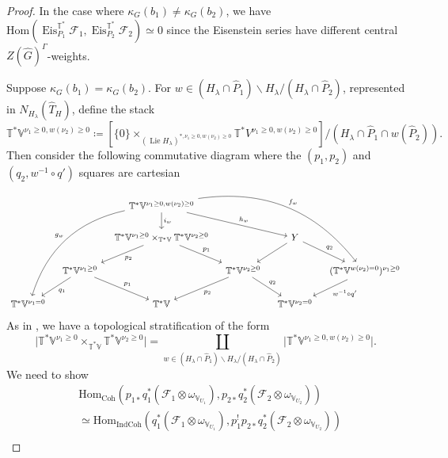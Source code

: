 \documentclass{amsart}
\theoremstyle{definition}
\theoremstyle{remark}
\numberwithin{equation}{section}
\DeclareMathOperator{\Lie}{Lie}
\newcommand{\mc}{\mathcal}
\newcommand{\Hom}{\mathrm{Hom}}
\newcommand{\wh}{\widehat}
\newcommand{\IndCoh}{\mathrm{IndCoh}}
\DeclareMathOperator{\Eis}{\mathrm{Eis}}
\newcommand{\Coh}{\mathrm{Coh}}
\newcommand{\V}{\mathbb{V}}
\newcommand{\T}{\mathbb{T}}
\begin{document}
\begin{proof}
In the case where $\kappa_G(b_1) \neq \kappa_G(b_2)$, we have $\Hom (\Eis^{\T^{\ast}}_{P_1} \mc F_1, \Eis^{\T^{\ast}}_{P_2} \mc F_2)\simeq 0$ since the Eisenstein series have different central $Z(\wh{G})^{\Gamma}$-weights. 

Suppose $\kappa_G(b_1) = \kappa_G(b_2)$. For $w\in (H_\lambda\cap \wh P_1)\backslash H_\lambda / (H_\lambda \cap \wh P_2)$, represented in $N_{H_\lambda}(\wh T_H)$, define the stack
\begin{equation*}
    \T^{\ast}\V^{\nu_1 \geq 0, w(\nu_2) \geq 0} \coloneq [\{0\} \times_{ (\Lie H_{\lambda})^{\ast, \nu_1 \geq 0, w(\nu_2) \geq 0}} \T^{\ast}V^{\nu_1 \geq 0, w(\nu_2) \geq 0}] / (H_{\lambda} \cap \wh P_1 \cap w(\wh P_2)).
\end{equation*}
Then consider the following commutative diagram where the $(p_1, p_2)$ and $(q_2, w^{-1} \circ q')$ squares are cartesian 
\[
\begin{tikzcd}[column sep=1em]
        && \T^* \V^{\nu_1 \geq 0, w(\nu_2)\geq 0} \arrow[d, "i_w"] \arrow[dddll,bend right,"g_w",swap] \arrow[ddrrr,bend left,"f_w"] \arrow[drr, "h_w"] \\
        && \T^\ast \V^{\nu_1\geq 0}\times_{\T^* \V}\T^\ast \V^{\nu_2\geq 0} \arrow[dl, "p_2"] \arrow[dr, "p_1"]  && Y \arrow[dl] \arrow[dr, "q_2"]\\
        & \T^\ast \V^{\nu_1\geq 0} \arrow[dl,"q_1"] \arrow[dr,"p_1"] && \T^* \V^{\nu_2 \geq 0}  \arrow[dl,"p_2"] \arrow[dr,"q_2"] && (\T^* \V^{w(\nu_2)=0})^{\nu_1 \geq 0} \arrow[dl, "w^{-1}\circ q'"]\\
        \T^* \V^{\nu_1=0} && \T^* \V && \T^* \V^{\nu_2=0}
\end{tikzcd}
\]
As in \cite[Proposition 3.6.1]{HansenMann}, we have a topological stratification of the form
\begin{equation*}
    \lvert\T^\ast \V^{\nu_1\geq 0}\times_{\T^* \V}\T^\ast \V^{\nu_2\geq 0}\rvert = \coprod\limits_{w \in (H_{\lambda} \cap \wh P_1) \backslash H_{\lambda} / (H_{\lambda} \cap \wh P_2)} \lvert\T^* \V^{\nu_1 \geq 0, w(\nu_2)\geq 0}\rvert.
\end{equation*}
We need to show 
\begin{align*}
&\Hom_{\Coh}(p_{1*}q_1^* (\mc F_1\otimes \omega_{\V_{U_1}}), p_{2*}q_2^* (\mc F_2\otimes \omega_{\V_{U_2}})) \\
&\simeq
\Hom_{\IndCoh}(q_1^* (\mc F_1\otimes \omega_{\V_{U_1}}), p_1^! p_{2*}q_2^* (\mc F_2\otimes \omega_{\V_{U_2}})) \\

\end{align*}
\end{proof}
\end{document}
